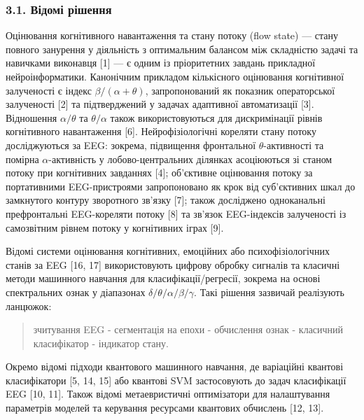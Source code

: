 \documentclass[12pt,a4paper]{article}
\begin{document}
\subsubsection{3.1. Відомі рішення}\label{ux432ux456ux434ux43eux43cux456-ux440ux456ux448ux435ux43dux43dux44f}



Оцінювання когнітивного навантаження та стану потоку (flow state) --- стану повного занурення у діяльність з оптимальним балансом між складністю задачі та навичками виконавця {[}1{]} --- є одним із пріоритетних завдань прикладної нейроінформатики. Канонічним прикладом кількісного оцінювання когнітивної залученості є індекс \(\beta/(\alpha+\theta)\), запропонований як показник операторської залученості {[}2{]} та підтверджений у задачах адаптивної автоматизації {[}3{]}. Відношення \(\alpha/\theta\) та \(\theta/\alpha\) також використовуються для дискримінації рівнів когнітивного навантаження {[}6{]}. Нейрофізіологічні кореляти стану потоку досліджуються за EEG: зокрема, підвищення фронтальної \(\theta\)-активності та помірна \(\alpha\)-активність у лобово-центральних ділянках асоціюються зі станом потоку при когнітивних завданнях {[}4{]}; об'єктивне оцінювання потоку за портативними EEG-пристроями запропоновано як крок від суб'єктивних шкал до замкнутого контуру зворотного зв'язку {[}7{]}; також досліджено одноканальні префронтальні EEG-кореляти потоку {[}8{]} та зв'язок EEG-індексів залученості із самозвітним рівнем потоку у когнітивних іграх {[}9{]}.



Відомі системи оцінювання когнітивних, емоційних або психофізіологічних станів за EEG {[}16, 17{]} використовують цифрову обробку сигналів та класичні методи машинного навчання для класифікації/регресії, зокрема на основі спектральних ознак у діапазонах \(\delta/\theta/\alpha/\beta/\gamma\). Такі рішення зазвичай реалізують ланцюжок:



\begin{quote}

зчитування EEG - сегментація на епохи - обчислення ознак - класичний класифікатор - індикатор стану.

\end{quote}



Окремо відомі підходи квантового машинного навчання, де варіаційні квантові класифікатори {[}5, 14, 15{]} або квантові SVM застосовують до задач класифікації EEG {[}10, 11{]}. Також відомі метаевристичні оптимізатори для налаштування параметрів моделей та керування ресурсами квантових обчислень {[}12, 13{]}.
\end{document}
